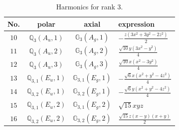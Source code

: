 \documentclass[fleqn,8pt,landscape]{jsarticle}
\begin{document}
\begin{table}[ht!]
\begin{center}
\caption{Harmonics for rank 3.}
\renewcommand{\arraystretch}{1.3}
\begin{tabular}{cccl} \hline \hline
No. & polar & axial & expression \\ \hline
$ 10 $ & $ \mathbb{Q}_{3}(A_{u},1) $ & $ \mathbb{G}_{3}(A_{g},1) $ & $ - \frac{z \left(3 x^{2} + 3 y^{2} - 2 z^{2}\right)}{2} $ \\
$ 11 $ & $ \mathbb{Q}_{3}(A_{u},2) $ & $ \mathbb{G}_{3}(A_{g},2) $ & $ \frac{\sqrt{10} y \left(3 x^{2} - y^{2}\right)}{4} $ \\
$ 12 $ & $ \mathbb{Q}_{3}(A_{u},3) $ & $ \mathbb{G}_{3}(A_{g},3) $ & $ \frac{\sqrt{10} x \left(x^{2} - 3 y^{2}\right)}{4} $ \\
$ 13 $ & $ \mathbb{Q}_{3,1}(E_{u},1) $ & $ \mathbb{G}_{3,1}(E_{g},1) $ & $ - \frac{\sqrt{6} x \left(x^{2} + y^{2} - 4 z^{2}\right)}{4} $ \\
$ 14 $ & $ \mathbb{Q}_{3,2}(E_{u},1) $ & $ \mathbb{G}_{3,2}(E_{g},1) $ & $ - \frac{\sqrt{6} y \left(x^{2} + y^{2} - 4 z^{2}\right)}{4} $ \\
$ 15 $ & $ \mathbb{Q}_{3,1}(E_{u},2) $ & $ \mathbb{G}_{3,1}(E_{g},2) $ & $ \sqrt{15} x y z $ \\
$ 16 $ & $ \mathbb{Q}_{3,2}(E_{u},2) $ & $ \mathbb{G}_{3,2}(E_{g},2) $ & $ \frac{\sqrt{15} z \left(x - y\right) \left(x + y\right)}{2} $ \\
 \hline \hline
\end{tabular}
\end{center}
\end{table}
\end{document}

